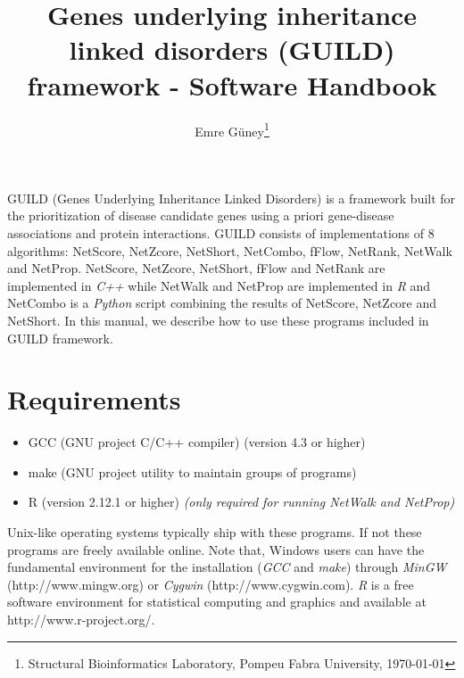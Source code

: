 \documentclass[11pt,twoside]{article}
\begin{document}
\title{Genes underlying inheritance linked disorders (GUILD) framework - Software Handbook}
\author{Emre G\"{u}ney\footnote{Structural Bioinformatics Laboratory, Pompeu Fabra University, \today}}
\date{}
\maketitle


GUILD (Genes Underlying Inheritance Linked Disorders) is a framework built for 
the prioritization of disease candidate genes using a priori gene-disease 
associations and protein interactions. 
GUILD consists of implementations of 8 algorithms: NetScore, NetZcore, NetShort,
NetCombo, fFlow, NetRank, NetWalk and NetProp. NetScore, NetZcore, NetShort, 
fFlow and NetRank are implemented in \textit{C++} while NetWalk and NetProp 
are implemented in \textit{R} and NetCombo is a \textit{Python} script combining
the results of NetScore, NetZcore and NetShort.
In this manual, we describe how to use these programs included in GUILD framework.

\tableofcontents




\section{Requirements}

\begin{itemize}
\item GCC (GNU project C/C++ compiler) (version 4.3 or higher)
\item make (GNU project utility to maintain groups of programs)
\item R (version 2.12.1 or higher) \textit{(only required for running NetWalk and NetProp)}
\end{itemize}

Unix-like operating systems typically ship with these programs. If not these
programs are freely available online. Note that, Windows users can have the 
fundamental environment for the installation (\textit{GCC} and \textit{make}) 
through {\it{MinGW}} (http://www.mingw.org) or {\it{Cygwin}} 
(http://www.cygwin.com).
\textit{R} is a free software environment for statistical computing and 
graphics and available at http://www.r-project.org/.
\end{document}
